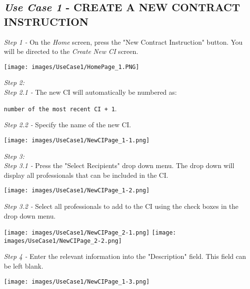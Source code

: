 \documentclass[11pt]{article}
\begin{document}
    \subsection{\textit{Use Case 1} - \uppercase{Create a New Contract Instruction}}
        \textit{Step 1 -} On the \textit{Home} screen, press the "New Contract Instruction" button. You will be directed to the \textit{Create New CI} screen.\\[0.5cm]
        \begin{center}
            \texttt{[image: images/UseCase1/HomePage\_1.PNG]}
        \end{center}
        \textit{Step 2:}\\[0.5cm]
        \textit{Step 2.1 -} The new CI will automatically be numbered as: \newline
        \begin{center}
            \texttt{number of the most recent CI + 1}.\\[0.5cm]
        \end{center}
        \textit{Step 2.2 -} Specify the name of the new CI.\\[0.5cm]
        \begin{center}
            \texttt{[image: images/UseCase1/NewCIPage\_1-1.png]}
        \end{center}
        \textit{Step 3:}\\[0.5cm]
        \textit{Step 3.1 -} Press the "Select Recipients" drop down menu. The drop down will display all professionals that can be included in the CI.\\[0.5cm]
        \begin{center}
            \texttt{[image: images/UseCase1/NewCIPage\_1-2.png]}
        \end{center}
        \textit{Step 3.2 -} Select all professionals to add to the CI using the check boxes in the drop down menu.\\[0.5cm]
        \begin{center}
            \texttt{[image: images/UseCase1/NewCIPage\_2-1.png]}
            \texttt{[image: images/UseCase1/NewCIPage\_2-2.png]}
        \end{center}
        \textit{Step 4 -} Enter the relevant information into the "Description" field. This field can be left blank.\\[0.5cm]
        \begin{center}
            \texttt{[image: images/UseCase1/NewCIPage\_1-3.png]}
        \end{center}
\end{document}
